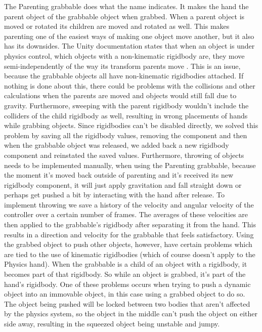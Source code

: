 The Parenting grabbable does what the name indicates. It makes the hand the parent object of the grabbable object when grabbed. When a parent object is moved or rotated its children are moved and rotated as well. This makes parenting one of the easiest ways of making one object move another, but it also has its downsides. The Unity documentation states that when an object is under physics control, which objects with a non-kinematic rigidbody are, they move semi-independently of the way its transform parents move \parencite{UnityManualRigidbody2017}. This is an issue, because the grabbable objects all have non-kinematic rigidbodies attached. If nothing is done about this, there could be problems with the collisions and other calculations when the parents are moved and objects would still fall due to gravity. Furthermore, sweeping with the parent rigidbody wouldn't include the colliders of the child rigidbody as well, resulting in wrong placements of hands while grabbing objects. Since rigidbodies can't be disabled directly, we solved this problem by saving all the rigidbody values, removing the component and then when the grabbable object was released, we added back a new rigidbody component and reinstated the saved values. Furthermore, throwing of objects needs to be implemented manually, when using the Parenting grabbable, because the moment it's moved back outside of parenting and it's received its new rigidbody component, it will just apply gravitation and fall straight down or perhaps get pushed a bit by interacting with the hand after release. To implement throwing we save a history of the velocity and angular velocity of the controller over a certain number of frames. The averages of these velocities are then applied to the grabbable's rigidbody after separating it from the hand. This results in a direction and velocity for the grabbable that feels satisfactory. Using the grabbed object to push other objects, however, have certain problems which are tied to the use of kinematic rigidbodies (which of course doesn't apply to the Physics hand). When the grabbable is a child of an object with a rigidbody, it becomes part of that rigidbody. So while an object is grabbed, it's part of the hand's rigidbody. One of these problems occurs when trying to push a dynamic object into an immovable object, in this case using a grabbed object to do so. The object being pushed will be locked between two bodies that aren't affected by the physics system, so the object in the middle can't push the object on either side away, resulting in the squeezed object being unstable and jumpy.


